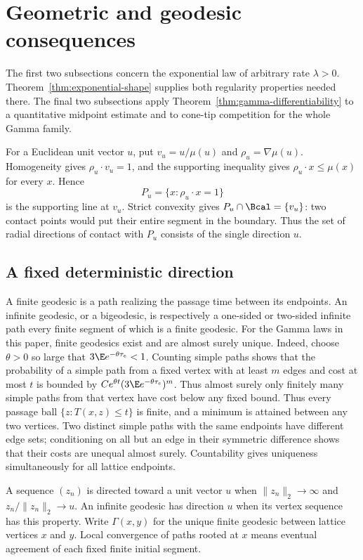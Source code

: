 \section{Geometric and geodesic consequences}
\label{sec:consequences}

The first two subsections concern the exponential law of arbitrary rate
$\lambda>0$. Theorem~\ref{thm:exponential-shape} supplies both regularity
properties needed there. The final two subsections apply
Theorem~\ref{thm:gamma-differentiability} to a quantitative midpoint
estimate and to cone-tip competition for the whole Gamma family.

For a Euclidean unit vector $u$, put $v_u=u/\mu(u)$ and
$\rho_u=\nabla\mu(u)$. Homogeneity gives
$\rho_u\cdot v_u=1$, and the supporting inequality gives
$\rho_u\cdot x\le\mu(x)$ for every $x$. Hence
\[
 P_u=\{x:\rho_u\cdot x=1\}
\]
is the supporting line at $v_u$. Strict convexity gives
$P_u\cap\Bcal=\{v_u\}$: two contact points would put their entire
segment in the boundary. Thus the set of radial directions of contact
with $P_u$ consists of the single direction $u$.

\subsection{A fixed deterministic direction}

A finite geodesic is a path realizing the passage time between its
endpoints. An infinite geodesic, or a bigeodesic, is respectively a
one-sided or two-sided infinite path every finite segment of which is
a finite geodesic. For the Gamma laws in this paper, finite geodesics
exist and are almost surely unique. Indeed, choose $\theta>0$ so large
that $3\E e^{-\theta\tau_e}<1$. Counting simple paths shows that the
probability of a simple path from a fixed vertex with at least $m$
edges and cost at most $t$ is bounded by
$C e^{\theta t}(3\E e^{-\theta\tau_e})^m$. Thus almost surely only
finitely many simple paths from that vertex have cost below any fixed
bound. Thus every passage ball $\{z:T(x,z)\le t\}$ is finite, and a
minimum is attained between any two vertices. Two distinct simple paths with the
same endpoints have different edge sets; conditioning on all but an
edge in their symmetric difference shows that their costs are unequal
almost surely. Countability gives uniqueness simultaneously for all
lattice endpoints.

A sequence $(z_n)$ is directed toward a unit vector $u$ when
$\lVert z_n\rVert_2\to\infty$ and
$z_n/\lVert z_n\rVert_2\to u$. An infinite geodesic has direction $u$
when its vertex sequence has this property. Write $\Gamma(x,y)$ for the
unique finite geodesic between lattice vertices $x$ and $y$. Local
convergence of paths rooted at $x$ means eventual agreement of each fixed
finite initial segment.

